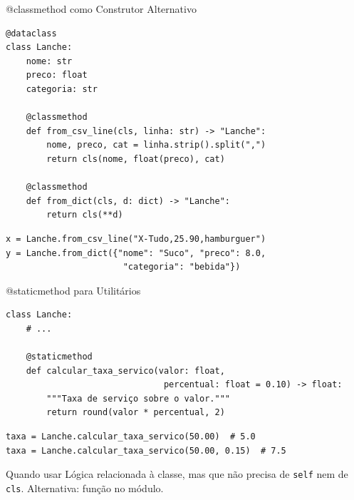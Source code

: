\documentclass[aspectratio=169]{beamer}
\begin{document}
\begin{frame}[fragile,shrink=10]{@classmethod como Construtor Alternativo}
\begin{lstlisting}
@dataclass
class Lanche:
    nome: str
    preco: float
    categoria: str

    @classmethod
    def from_csv_line(cls, linha: str) -> "Lanche":
        nome, preco, cat = linha.strip().split(",")
        return cls(nome, float(preco), cat)

    @classmethod
    def from_dict(cls, d: dict) -> "Lanche":
        return cls(**d)
\end{lstlisting}

\begin{lstlisting}
x = Lanche.from_csv_line("X-Tudo,25.90,hamburguer")
y = Lanche.from_dict({"nome": "Suco", "preco": 8.0,
                       "categoria": "bebida"})
\end{lstlisting}
\end{frame}

\begin{frame}[fragile,shrink=3]{@staticmethod para Utilitários}
\begin{lstlisting}
class Lanche:
    # ...

    @staticmethod
    def calcular_taxa_servico(valor: float,
                               percentual: float = 0.10) -> float:
        """Taxa de serviço sobre o valor."""
        return round(valor * percentual, 2)
\end{lstlisting}

\begin{lstlisting}
taxa = Lanche.calcular_taxa_servico(50.00)  # 5.0
taxa = Lanche.calcular_taxa_servico(50.00, 0.15)  # 7.5
\end{lstlisting}

\begin{exampleblock}{Quando usar}
Lógica relacionada à classe, mas que não precisa de \texttt{self} nem de \texttt{cls}. Alternativa: função no módulo.
\end{exampleblock}
\end{frame}
\end{document}

